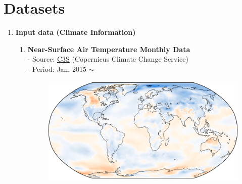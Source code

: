 \documentclass[11pt, oneside]{article}   	%
\begin{document}
\section*{Datasets}

\begin{enumerate}
\item \textbf{Input data (Climate Information)}
	\begin{enumerate}[label=(\alph*)]
	\item \textbf{Near-Surface Air Temperature Monthly Data} \\
	- Source: \href{https://cds.climate.copernicus.eu/}{C3S} (Copernicus Climate Change Service) \\
	- Period: Jan. 2015 $\sim$ \\
	\begin{figure}[htbp]
    		\centering
	    \begin{minipage}{0.6\textwidth}
    		\includegraphics[width=\textwidth]{images/image_for_proposal_1.png}
	    \end{minipage}%


\end{figure}
\end{enumerate}
\end{enumerate}
\end{document}
